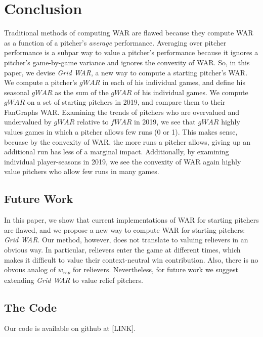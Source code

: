 \documentclass[12pt]{article}
\begin{document}
\clearpage

\section{Conclusion}

Traditional methods of computing WAR are flawed because they compute WAR as a function of a pitcher's \textit{average} performance. Averaging over pitcher performance is a subpar way to value a pitcher's performance because it ignores a pitcher's game-by-game variance and ignores the convexity of WAR. So, in this paper, we devise \textit{Grid WAR}, a new way to compute a starting pitcher's WAR. We compute a pitcher's $gWAR$ in each of his individual games, and define his seasonal $gWAR$ as the sum of the $gWAR$ of his individual games. We compute $gWAR$ on a set of starting pitchers in 2019, and compare them to their FanGraphs WAR. Examining the trends of pitchers who are overvalued and undervalued by $gWAR$ relative to $fWAR$ in 2019, we see that $gWAR$ highly values games in which a pitcher allows few runs (0 or 1). This makes sense, becuase by the convexity of WAR, the more runs a pitcher allows, giving up an additional run has less of a marginal impact. Additionally, by examining individual player-seasons in 2019, we see the convexity of WAR again highly value pitchers who allow few runs in many games.

\subsection{Future Work}

In this paper, we show that current implementations of WAR for starting pitchers are flawed, and we propose a new way to compute WAR for starting pitchers: \textit{Grid WAR}. Our method, however, does not translate to valuing relievers in an obvious way. In particular, relievers enter the game at different times, which makes it difficult to value their context-neutral win contribution. Also, there is no obvous analog of $w_{rep}$ for relievers. Nevertheless, for future work we suggest extending \textit{Grid WAR} to value relief pitchers.

\subsection{The Code}

Our code is available on github at [LINK].


 \clearpage
 
 
\end{document}
